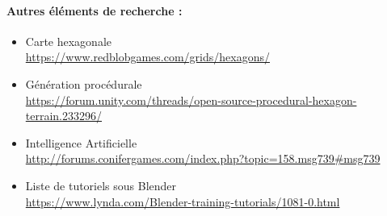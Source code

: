 \documentclass[12pt]{report}
\begin{document}
\paragraph{\bfseries{Autres éléments de recherche :}}

\begin{itemize}[label=\textbullet]
    \item Carte hexagonale \\ \url{https://www.redblobgames.com/grids/hexagons/}
    \item Génération procédurale \\ \url{https://forum.unity.com/threads/open-source-procedural-hexagon-terrain.233296/}
    \item Intelligence Artificielle \\ \url{http://forums.conifergames.com/index.php?topic=158.msg739#msg739}
    \item Liste de tutoriels sous Blender \\ \url{https://www.lynda.com/Blender-training-tutorials/1081-0.html}
\end{itemize}
\end{document}
